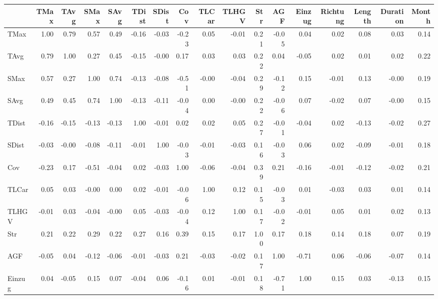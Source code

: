 \begin{tabular}{lrrrrrrrrrrrrrrrr}
\toprule
{} &  TMax &  TAvg &  SMax &  SAvg &  TDist &  SDist &   Cov &  TLCar &  TLHGV &  Str &   AGF &  Einzug &  Richtung &  Length &  Duration &  Month \\
\midrule
TMax     &  1.00 &  0.79 &  0.57 &  0.49 &  -0.16 &  -0.03 & -0.23 &   0.05 &  -0.01 & 0.21 & -0.05 &    0.04 &      0.02 &    0.08 &      0.03 &   0.14 \\
TAvg     &  0.79 &  1.00 &  0.27 &  0.45 &  -0.15 &  -0.00 &  0.17 &   0.03 &   0.03 & 0.22 &  0.04 &   -0.05 &      0.02 &    0.01 &      0.02 &   0.22 \\
SMax     &  0.57 &  0.27 &  1.00 &  0.74 &  -0.13 &  -0.08 & -0.51 &  -0.00 &  -0.04 & 0.29 & -0.12 &    0.15 &     -0.01 &    0.13 &     -0.00 &   0.19 \\
SAvg     &  0.49 &  0.45 &  0.74 &  1.00 &  -0.13 &  -0.11 & -0.04 &   0.00 &  -0.00 & 0.22 & -0.06 &    0.07 &     -0.02 &    0.07 &     -0.00 &   0.15 \\
TDist    & -0.16 & -0.15 & -0.13 & -0.13 &   1.00 &  -0.01 &  0.02 &   0.02 &   0.05 & 0.27 & -0.01 &   -0.04 &      0.02 &   -0.13 &     -0.02 &   0.27 \\
SDist    & -0.03 & -0.00 & -0.08 & -0.11 &  -0.01 &   1.00 & -0.03 &  -0.01 &  -0.03 & 0.16 & -0.03 &    0.06 &      0.02 &   -0.09 &     -0.01 &   0.18 \\
Cov      & -0.23 &  0.17 & -0.51 & -0.04 &   0.02 &  -0.03 &  1.00 &  -0.06 &  -0.04 & 0.39 &  0.21 &   -0.16 &     -0.01 &   -0.12 &     -0.02 &   0.21 \\
TLCar    &  0.05 &  0.03 & -0.00 &  0.00 &   0.02 &  -0.01 & -0.06 &   1.00 &   0.12 & 0.15 & -0.03 &    0.01 &     -0.03 &    0.03 &      0.01 &   0.14 \\
TLHGV    & -0.01 &  0.03 & -0.04 & -0.00 &   0.05 &  -0.03 & -0.04 &   0.12 &   1.00 & 0.17 & -0.02 &   -0.01 &      0.05 &    0.01 &      0.02 &   0.13 \\
Str      &  0.21 &  0.22 &  0.29 &  0.22 &   0.27 &   0.16 &  0.39 &   0.15 &   0.17 & 1.00 &  0.17 &    0.18 &      0.14 &    0.18 &      0.07 &   0.19 \\
AGF      & -0.05 &  0.04 & -0.12 & -0.06 &  -0.01 &  -0.03 &  0.21 &  -0.03 &  -0.02 & 0.17 &  1.00 &   -0.71 &      0.06 &   -0.06 &     -0.07 &   0.14 \\
Einzug   &  0.04 & -0.05 &  0.15 &  0.07 &  -0.04 &   0.06 & -0.16 &   0.01 &  -0.01 & 0.18 & -0.71 &    1.00 &      0.15 &    0.03 &     -0.13 &   0.15 \\

\end{tabular}
